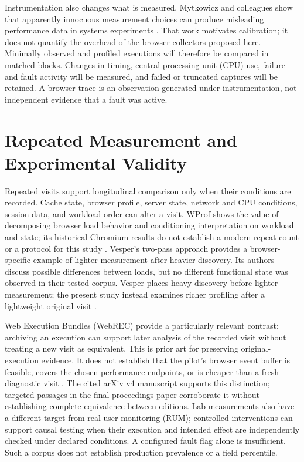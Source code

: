 Instrumentation also changes what is measured. Mytkowicz and colleagues show that apparently innocuous measurement choices can produce misleading performance data in systems experiments \parencite{IWCIN2C5}. That work motivates calibration; it does not quantify the overhead of the browser collectors proposed here. Minimally observed and profiled executions will therefore be compared in matched blocks. Changes in timing, central processing unit (CPU) use, failure and fault activity will be measured, and failed or truncated captures will be retained. A browser trace is an observation generated under instrumentation, not independent evidence that a fault was active.

\section{Repeated Measurement and Experimental Validity}

Repeated visits support longitudinal comparison only when their conditions are recorded. Cache state, browser profile, server state, network and CPU conditions, session data, and workload order can alter a visit. WProf shows the value of decomposing browser load behavior and conditioning interpretation on workload and state; its historical Chromium results do not establish a modern repeat count or a protocol for this study \parencite{D568X6SQ}. Vesper's two-pass approach provides a browser-specific example of lighter measurement after heavier discovery. Its authors discuss possible differences between loads, but no different functional state was observed in their tested corpus. Vesper places heavy discovery before lighter measurement; the present study instead examines richer profiling after a lightweight original visit \parencite{HS3PKWFL}.

Web Execution Bundles (WebREC) provide a particularly relevant contrast: archiving an execution can support later analysis of the recorded visit without treating a new visit as equivalent. This is prior art for preserving original-execution evidence. It does not establish that the pilot's browser event buffer is feasible, covers the chosen performance endpoints, or is cheaper than a fresh diagnostic visit \parencite{ZZSL9IPU}. The cited arXiv v4 manuscript supports this distinction; targeted passages in the final proceedings paper corroborate it without establishing complete equivalence between editions. Lab measurements also have a different target from real-user monitoring (RUM); controlled interventions can support causal testing when their execution and intended effect are independently checked under declared conditions. A configured fault flag alone is insufficient. Such a corpus does not establish production prevalence or a field percentile.

